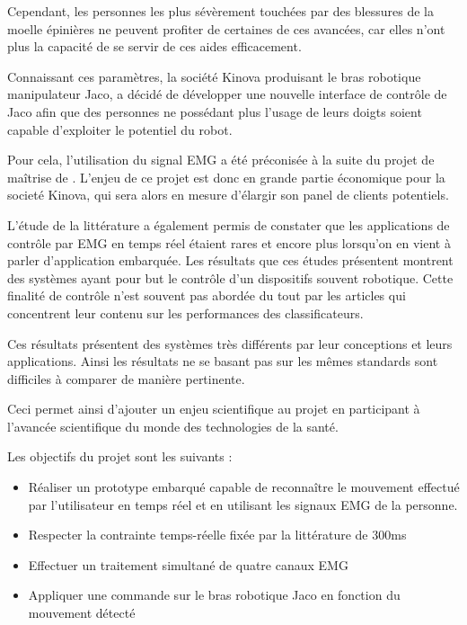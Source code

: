 \documentclass[letterpaper, twoside, 12pt, memoire, creativecommons, hyperref]{thETS}
\begin{document}
Cependant, les personnes les plus sévèrement touchées par des blessures de la moelle épinières ne peuvent profiter de certaines de ces avancées, car elles n'ont plus la capacité de se servir de ces aides efficacement. 

Connaissant ces paramètres, la société Kinova produisant le bras robotique manipulateur Jaco, a décidé de développer une nouvelle interface de contrôle de Jaco afin que des personnes ne possédant plus l'usage de leurs doigts soient capable d'exploiter le potentiel du robot.

Pour cela, l'utilisation du signal EMG a été préconisée à la suite du projet de maîtrise de \cite{Maheu2011}. L'enjeu de ce projet est donc en grande partie économique pour la societé Kinova, qui sera alors en mesure d'élargir son panel de clients potentiels.

L'étude de la littérature a également permis de constater que les applications de contrôle par EMG en temps réel étaient rares et encore plus lorsqu'on en vient à parler d'application embarquée. Les résultats que ces études présentent montrent des systèmes ayant pour but le contrôle d'un dispositifs souvent robotique. Cette finalité de contrôle n'est souvent pas abordée du tout par les articles qui concentrent leur contenu sur les performances des classificateurs. 

Ces résultats présentent des systèmes très différents par leur conceptions et leurs applications. Ainsi les résultats ne se basant pas sur les mêmes standards sont difficiles à comparer de manière pertinente.

Ceci permet ainsi d'ajouter un enjeu scientifique au projet en participant à l'avancée scientifique du monde des technologies de la santé.

Les objectifs du projet sont les suivants : 

\begin{itemize}
 \item Réaliser un prototype embarqué capable de reconnaître le mouvement effectué par l'utilisateur en temps réel et en utilisant les signaux EMG de la personne.
 \item Respecter la contrainte temps-réelle fixée par la littérature de 300ms
 \item Effectuer un traitement simultané de quatre canaux EMG
 \item Appliquer une commande sur le bras robotique Jaco en fonction du mouvement détecté
\end{itemize}
\end{document}
